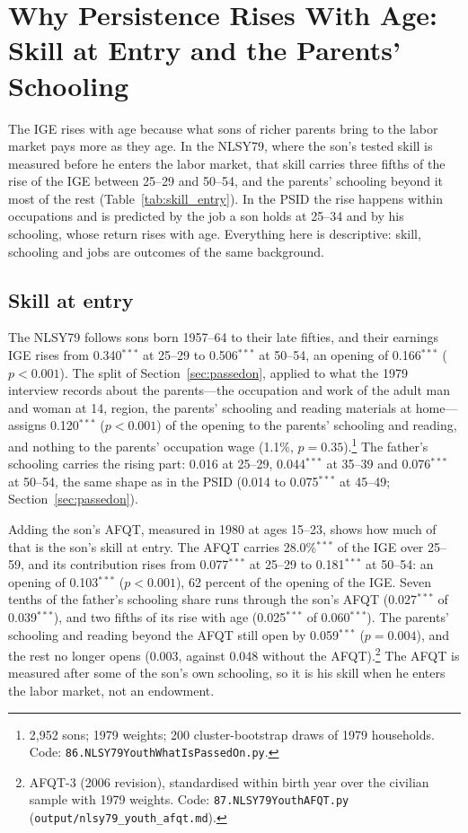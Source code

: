 \section{Why Persistence Rises With Age: Skill at Entry and the Parents' Schooling}\label{sec:skill}

The IGE rises with age because what sons of richer parents bring to the labor market pays more as they age. In the
NLSY79, where the son's tested skill is measured before he enters the labor market, that skill carries three fifths of
the rise of the IGE between 25--29 and 50--54, and the parents' schooling beyond it most of the rest
(Table~\ref{tab:skill_entry}). In the PSID the rise happens within occupations and is predicted by the job a son holds
at 25--34 and by his schooling, whose return rises with age. Everything here is descriptive: skill, schooling and jobs
are outcomes of the same background.

\subsection{Skill at entry}

The NLSY79 follows sons born 1957--64 to their late fifties, and their earnings IGE rises from 0.340$^{***}$ at 25--29 to
0.506$^{***}$ at 50--54, an opening of 0.166$^{***}$ ($p<0.001$). The split of Section~\ref{sec:passedon}, applied to what
the 1979 interview records about the parents---the occupation and work of the adult man and woman at 14, region, the
parents' schooling and reading materials at home---assigns 0.120$^{***}$ ($p<0.001$) of the opening to the parents'
schooling and reading, and nothing to the parents' occupation wage (1.1\%, $p = 0.35$).\footnote{2,952 sons; 1979
weights; 200 cluster-bootstrap draws of 1979 households. Code: \texttt{86.NLSY79YouthWhatIsPassedOn.py}.} The father's
schooling carries the rising part: 0.016 at 25--29, 0.044$^{***}$ at 35--39 and 0.076$^{***}$ at 50--54, the same shape as
in the PSID (0.014 to 0.075$^{***}$ at 45--49; Section~\ref{sec:passedon}).

Adding the son's AFQT, measured in 1980 at ages 15--23, shows how much of that is the son's skill at entry. The AFQT
carries 28.0\%$^{***}$ of the IGE over 25--59, and its contribution rises from 0.077$^{***}$ at 25--29 to 0.181$^{***}$ at
50--54: an opening of 0.103$^{***}$ ($p<0.001$), 62 percent of the opening of the IGE. Seven tenths of the father's
schooling share runs through the son's AFQT (0.027$^{***}$ of 0.039$^{***}$), and two fifths of its rise with age
(0.025$^{***}$ of 0.060$^{***}$). The parents' schooling and reading beyond the AFQT still open by 0.059$^{***}$
($p = 0.004$), and the rest no longer opens (0.003, against 0.048 without the AFQT).\footnote{AFQT-3 (2006 revision),
standardised within birth year over the civilian sample with 1979 weights. Code: \texttt{87.NLSY79YouthAFQT.py}
(\texttt{output/nlsy79\_youth\_afqt.md}).} The AFQT is measured after some of the son's own schooling, so it is his
skill when he enters the labor market, not an endowment.

